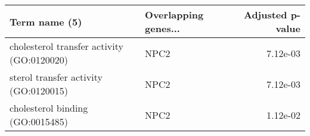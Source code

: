 \begin{tabular}{llr}
\toprule
                             Term name (5) & Overlapping genes... &  Adjusted p-value \\
\midrule
cholesterol transfer activity (GO:0120020) &                 NPC2 &          7.12e-03 \\
     sterol transfer activity (GO:0120015) &                 NPC2 &          7.12e-03 \\
          cholesterol binding (GO:0015485) &                 NPC2 &          1.12e-02 \\
\bottomrule
\end{tabular}
